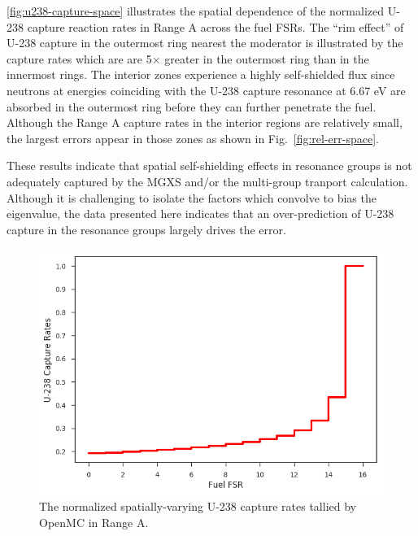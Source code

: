 \autoref{fig:u238-capture-space} illustrates the spatial dependence of the normalized U-238 capture reaction rates in Range A across the fuel FSRs. The ``rim effect'' of U-238 capture in the outermost ring nearest the moderator is illustrated by the capture rates which are are 5$\times$ greater in the outermost ring than in the innermost rings. The interior zones experience a highly self-shielded flux since neutrons at energies coinciding with the U-238 capture resonance at 6.67 eV are absorbed in the outermost ring before they can further penetrate the fuel. Although the Range A capture rates in the interior regions are relatively small, the largest errors appear in those zones as shown in Fig.~\ref{fig:rel-err-space}. 

These results indicate that spatial self-shielding effects in resonance groups is not adequately captured by the MGXS and/or the multi-group tranport calculation. Although it is challenging to isolate the factors which convolve to bias the eigenvalue, the data presented here indicates that an over-prediction of U-238 capture in the resonance groups largely drives the error.


\begin{figure}[h!]
\centering
\includegraphics[width=\linewidth]{figures/u238-capt-rates-fuel-fsrs}
\caption{The normalized spatially-varying U-238 capture rates tallied by OpenMC in Range A.}
\label{fig:u238-capture-space}
\end{figure}
